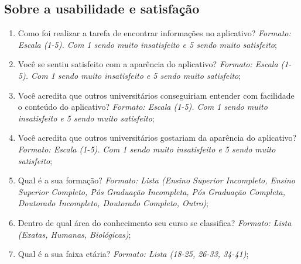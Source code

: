 \documentclass[12pt]{article}
\begin{document}
\subsection{Sobre a usabilidade e satisfação}

\begin{enumerate}
	\item Como foi realizar a tarefa de encontrar informações no aplicativo? \textit{Formato: Escala (1-5). Com 1 sendo muito insatisfeito e 5 sendo muito satisfeito};
	\item Você se sentiu satisfeito com a aparência do aplicativo? \textit{Formato: Escala (1-5). Com 1 sendo muito insatisfeito e 5 sendo muito satisfeito};
	\item Você acredita que outros universitários conseguiriam entender com facilidade o conteúdo do aplicativo? \textit{Formato: Escala (1-5). Com 1 sendo muito insatisfeito e 5 sendo muito satisfeito};
	\item Você acredita que outros universitários gostariam da aparência do aplicativo? \textit{Formato: Escala (1-5). Com 1 sendo muito insatisfeito e 5 sendo muito satisfeito};
	\item Qual é a sua formação? \textit{Formato: Lista (Ensino Superior Incompleto, Ensino Superior Completo, Pós Graduação Incompleta, Pós Graduação Completa, Doutorado Incompleto, Doutorado Completo, Outro)};
	\item Dentro de qual área do conhecimento seu curso se classifica? \textit{Formato: Lista (Exatas, Humanas, Biológicas)};
	\item Qual é a sua faixa etária? \textit{Formato: Lista (18-25, 26-33, 34-41)};
\end{enumerate}
\end{document}
